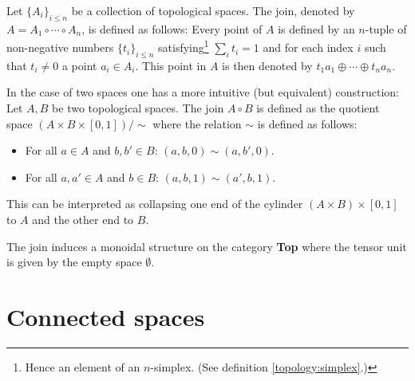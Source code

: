     \begin{construct}[Join]
        Let $\{A_i\}_{i\leq n}$ be a collection of topological spaces. The join, denoted by $A=A_1\circ\cdots\circ A_n$, is defined as follows: Every point of $A$ is defined by an $n$-tuple of non-negative numbers $\{t_i\}_{i\leq n}$ satisfying\footnote{Hence an element of an $n$-simplex. (See definition \ref{topology:simplex}.)} $\sum_it_i=1$ and for each index $i$ such that $t_i\neq 0$ a point $a_i\in A_i$. This point in $A$ is then denoted by $t_1a_1\oplus\cdots\oplus t_na_n$.

        In the case of two spaces one has a more intuitive (but equivalent) construction: Let $A, B$ be two topological spaces. The join $A\circ B$ is defined as the quotient space $(A\times B\times [0, 1])/\sim$ where the relation $\sim$ is defined as follows:
        \begin{itemize}
            \item For all $a\in A$ and $b, b'\in B$: $(a, b, 0)\sim(a, b', 0)$.
            \item For all $a, a'\in A$ and $b\in B$: $(a, b, 1)\sim(a', b, 1)$.
        \end{itemize}
        This can be interpreted as collapsing one end of the cylinder $(A\times B)\times[0, 1]$ to $A$ and the other end to $B$.
    \end{construct}
    \begin{property}
        The join induces a monoidal structure on the category \textbf{Top} where the tensor unit is given by the empty space $\emptyset$.
    \end{property}


\section{Connected spaces}


